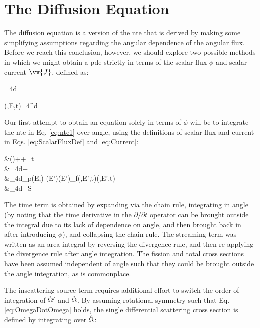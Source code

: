 \section{The Diffusion Equation}
\label{sec:Diffusion}

The diffusion equation is a version of the \gls{nte} that is derived by making some simplifying assumptions regarding the angular dependence of the angular flux. Before we reach this conclusion, however, we should explore two possible methods in which we might obtain a \gls{pde} strictly in terms of the scalar flux \(\phi\) and scalar current \(\vv{J}\), defined as:

\beq
\label{eq:ScalarFluxDef}
\phi\sset\equiv\int_{4\pi}d\hO\psi\seat
\eeq

\beq
\label{eq:Current}
(,E,t)\equiv\int_{4\pi}^{}d\hO  {}\seat
\eeq

Our first attempt to obtain an equation solely in terms of \(\phi\) will be to integrate the \gls{nte} in Eq. \eqref{eq:nte1} over angle, using the definitions of scalar flux and current in Eqs. \eqref{eq:ScalarFluxDef} and \eqref{eq:Current}:

\beqa
\label{eq:NeutronContinuityEquation}
&\left(\right)+\nabla\cdot{}\sset+\Sigma_t\sset\phi\sset=\\
&\hspace{1cm}\int_{4\pi}d\hO\inscatteringsource\psi\seatelse+\\
&\hspace{2cm}\int_{4\pi}d\hO\chi_p(E,\hO)\dEprime\left{}-\beta(E')\right\rbrack\nu(E')\Sigma_f(,E',t)\phi(,E',t)+\\
&\hspace{3cm}\int_{4\pi}d\hO\delayedfissionsource+S\sset
\eeqa

The time term is obtained by expanding via the chain rule, integrating in angle (by noting that the time derivative in the \(\partial/\partial t\) operator can be brought outside the integral due to its lack of dependence on angle, and then brought back in after introducing \(\phi\)), and collapsing the chain rule. The streaming term was written as an area integral by reversing the divergence rule, and then re-applying the divergence rule after angle integration. The fission and total cross sections have been assumed independent of angle such that they could be brought outside the angle integration, as is commonplace. 

The inscattering source term requires additional effort to switch the order of integration of \(\hat{\Omega}'\) and \(\hat{\Omega}\). By assuming rotational symmetry such that Eq. \eqref{eq:OmegaDotOmega} holds, the single differential scattering cross section is defined by integrating over \(\hat{\Omega}\):

